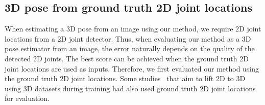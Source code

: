 \documentclass[runningheads]{llncs}
\newcommand{\matsui}[1]{\textbf{\textcolor{cyan}{[\textsc{MATSUI:} #1]}}}
\begin{document}
\subsection{3D pose from ground truth 2D joint locations}

\begin{table}[tb]
	\begin{center}
	\end{center}
	\caption{Average error in millimeters between the predicted 3D pose and the ground truth 3D pose using the ground truth 2D pose as input. While the methods except for ours use a 3D dataset during training, our method does not use a 3D dataset, and is performed in a completely unsupervised manner.}
	\label{gt2d}
\end{table}

When estimating a 3D pose from an image using our method, we require 2D joint locations from a 2D joint detector.
Thus, when evaluating our method as a 3D pose estimator from an image, the error naturally depends on the quality of the detected 2D joints.
The best score can be achieved when the ground truth 2D joint locations are used as inputs.
Therefore, we first evaluated our method using the ground truth 2D joint locations.
Some studies~\cite{martinez20173dbaseline,tung2017adversarial} that aim to lift 2D to 3D using 3D datasets during training had also used ground truth 2D joint locations for evaluation.
\end{document}
